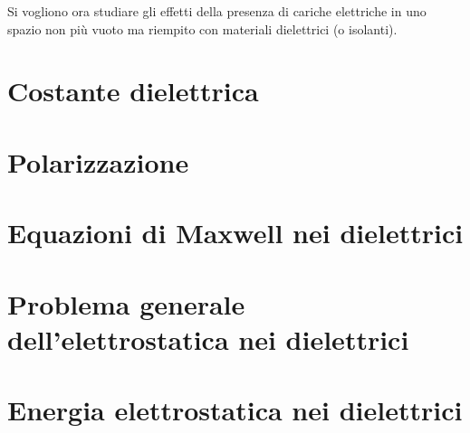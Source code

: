Si vogliono ora studiare gli effetti della presenza di cariche elettriche in uno spazio non più vuoto ma riempito con materiali dielettrici (o isolanti).

\section{Costante dielettrica}


\section{Polarizzazione}


\section{Equazioni di Maxwell nei dielettrici}


\section{Problema generale dell'elettrostatica nei dielettrici}


\section{Energia elettrostatica nei dielettrici}

